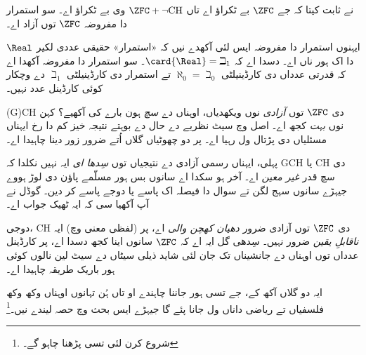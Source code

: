 \documentclass[../../../include/open-logic-section]{subfiles}
\begin{document}
\citet{Cohen1963} نے ثابت کیتا کہ جے $\ZFC$ بے ٹکراؤ اے تاں $\ZFC
+ \lnot\text{CH}$ وی بے ٹکراؤ اے۔ سو استمرار دا مفروضہ $\ZFC$ توں آزاد اے۔

ایہنوں استمرار دا مفروضہ ایس لئی آکھدے نیں کہ «استمرار» حقیقی عددی لکیر $\Real$ دا اک ہور ناں اے۔  دسدا اے کہ $\card{\Real} =
\beth_1$۔ سو استمرار دا مفروضہ آکھدا اے کہ قدرتی عدداں دی کارڈینیلٹی $\aleph_0 = \beth_0$ تے استمرار دی کارڈینیلٹی $\beth_1$ دے وچکار کوئی کارڈینل عدد نہیں۔

(G)CH دی $\ZFC$ توں \emph{آزادی} نوں ویکھدیاں، اوہناں دے \emph{سچ} ہون بارے کی آکھیے؟ کہن نوں \emph{بہت} کجھ اے۔ اصل وچ سیٹ نظریے دے حال دے بوہتے نتیجہ خیز کم دا رخ ایہناں مسئلیاں دی پڑتال ول رہیا اے۔ پر دو چھوٹیاں گلاں اُتے ضرور زور دینا چاہیدا اے۔

پہلی، ایہناں رسمی آزادی دے نتیجیاں توں \emph{سِدھا ای} ایہ نہیں نکلدا کہ GCH یا CH دی سچ قدر \emph{غیر معین} اے۔ آخر ہو سکدا اے سانوں بس ہور مسلّمے پاؤن دی لوڑ ہووے جیہڑے سانوں سہج لگن تے سوال دا فیصلہ اک پاسے یا دوجے پاسے کر دین۔ گوڈل نے آپ آکھیا سی کہ ایہ ٹھیک جواب اے۔

دوجی، CH دی $\ZFC$ توں آزادی ضرور \emph{دھیان کھچن والی} اے، پر (لفظی معنی وچ) ایہ \emph{ناقابلِ یقین} ضرور نہیں۔ سِدھی گل ایہ اے کہ $\ZFC$ سانوں اینا کجھ دسدا اے، پر کارڈینل عدداں توں اوہناں دے جانشیناں تک جان لئی شاید ذیلی سیٹاں دے سیٹ لین نالوں کوئی ہور باریک طریقہ چاہیدا اے۔

ایہ دو گلاں آکھ کے، جے تسی ہور جاننا چاہندے او تاں ہُن تہانوں اوہناں وکھ وکھ فلسفیاں تے ریاضی داناں ول جانا پئے گا جیہڑے ایس بحث وچ حصہ لیندے نیں۔\footnote{شروع کرن لئی تسی \citet[\S15.6]{Potter2004} پڑھنا چاہو گے۔}
\end{document}
